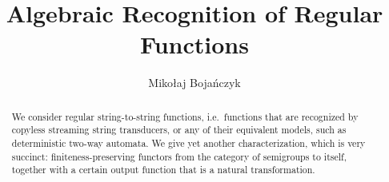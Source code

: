 \documentclass[a4paper,USenglish,cleveref,autoref,thm-restate,numberwithinsect,anonymous]{lipics-v2021}
\title{Algebraic Recognition of Regular Functions} %
\author{Mikołaj Bojańczyk}{Institute of Informatics, University of Warsaw, Poland \and \url{https://www.mimuw.edu.pl/~bojan/}}{bojan@mimuw.edu.pl}{}{{\color{red}(Optional) author-specific funding acknowledgements}}%
\begin{document}
\maketitle

\begin{abstract}
    We consider regular string-to-string functions, i.e.~functions that are recognized by copyless streaming string transducers, or  any of their equivalent models, such as deterministic two-way automata. We give yet another characterization, which is very succinct: finiteness-preserving functors from the category of semigroups to itself, together with a certain output function that is a natural transformation.
\end{abstract}

\newcommand{\moncat}{\mathrm{Mon}}
\newcommand{\semcat}{\mathrm{Sem}}












\appendix








\end{document}
